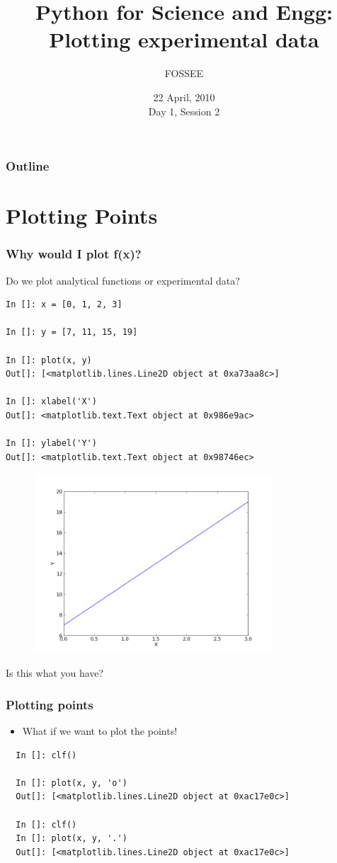 \documentclass[14pt,compress]{beamer}
\title[Plotting with Python]{Python for Science and Engg: Plotting experimental data}
\author[FOSSEE] {FOSSEE}
\institute[IIT Bombay] {Department of Aerospace Engineering\\IIT Bombay}
\date[] {22 April, 2010\\Day 1, Session 2}
\begin{document}
\begin{frame}
  \titlepage
\end{frame}

\begin{frame}
  \frametitle{Outline}
  \tableofcontents
\end{frame}

\section{Plotting Points}
\begin{frame}[fragile]
\frametitle{Why would I plot f(x)?}
Do we plot analytical functions or experimental data?
\begin{small}
\begin{lstlisting}
In []: x = [0, 1, 2, 3]

In []: y = [7, 11, 15, 19]

In []: plot(x, y)
Out[]: [<matplotlib.lines.Line2D object at 0xa73aa8c>]

In []: xlabel('X')
Out[]: <matplotlib.text.Text object at 0x986e9ac>

In []: ylabel('Y')
Out[]: <matplotlib.text.Text object at 0x98746ec>
\end{lstlisting}
\end{small}
\end{frame}

\begin{frame}[fragile]
\begin{figure}
\includegraphics[width=3.5in]{data/straightline.png}
\end{figure}
\alert{Is this what you have?}
\end{frame}

\begin{frame}[fragile]
\frametitle{Plotting points}
\begin{itemize}
\item What if we want to plot the points!
\end{itemize}
\begin{lstlisting}
  In []: clf()

  In []: plot(x, y, 'o')
  Out[]: [<matplotlib.lines.Line2D object at 0xac17e0c>]

  In []: clf()
  In []: plot(x, y, '.')
  Out[]: [<matplotlib.lines.Line2D object at 0xac17e0c>]
\end{lstlisting}
\end{frame}
\end{document}
